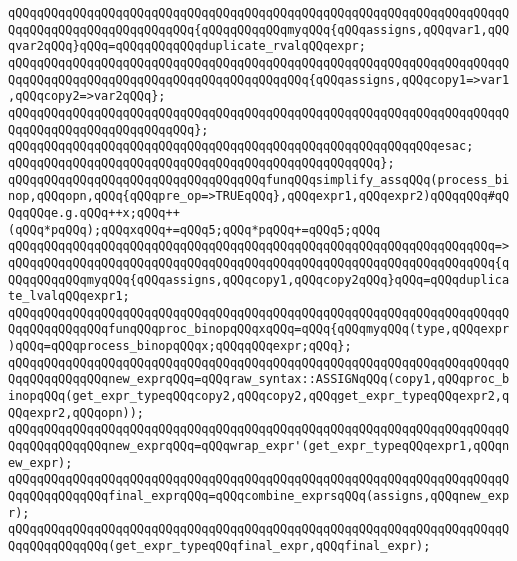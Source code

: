 \verb|qQQqqQQqqQQqqQQqqQQqqQQqqQQqqQQqqQQqqQQqqQQqqQQqqQQqqQQqqQQqqQQqqQQqqQQqqQQqqQQqqQQqqQQqqQQqqQQq{qQQqqQQqqQQqmyqQQq{qQQqassigns,qQQqvar1,qQQqvar2qQQq}qQQq=qQQqqQQqqQQqduplicate_rvalqQQqexpr;|\newline
\newline
\verb|qQQqqQQqqQQqqQQqqQQqqQQqqQQqqQQqqQQqqQQqqQQqqQQqqQQqqQQqqQQqqQQqqQQqqQQqqQQqqQQqqQQqqQQqqQQqqQQqqQQqqQQqqQQqqQQq{qQQqassigns,qQQqcopy1=>var1,qQQqcopy2=>var2qQQq};|\newline
\verb|qQQqqQQqqQQqqQQqqQQqqQQqqQQqqQQqqQQqqQQqqQQqqQQqqQQqqQQqqQQqqQQqqQQqqQQqqQQqqQQqqQQqqQQqqQQqqQQq};|\newline
\verb|qQQqqQQqqQQqqQQqqQQqqQQqqQQqqQQqqQQqqQQqqQQqqQQqqQQqqQQqqQQqesac;|\newline
\verb|qQQqqQQqqQQqqQQqqQQqqQQqqQQqqQQqqQQqqQQqqQQqqQQqqQQq};|\newline
\newline
\verb|qQQqqQQqqQQqqQQqqQQqqQQqqQQqqQQqqQQqfunqQQqsimplify_assqQQq(process_binop,qQQqopn,qQQq{qQQqpre_op=>TRUEqQQq},qQQqexpr1,qQQqexpr2)qQQqqQQq#qQQqqQQqe.g.qQQq++x;qQQq++(qQQq*pqQQq);qQQqxqQQq+=qQQq5;qQQq*pqQQq+=qQQq5;qQQq|\newline
\verb|qQQqqQQqqQQqqQQqqQQqqQQqqQQqqQQqqQQqqQQqqQQqqQQqqQQqqQQqqQQqqQQqqQQq=>|\newline
\verb|qQQqqQQqqQQqqQQqqQQqqQQqqQQqqQQqqQQqqQQqqQQqqQQqqQQqqQQqqQQqqQQqqQQq{qQQqqQQqqQQqmyqQQq{qQQqassigns,qQQqcopy1,qQQqcopy2qQQq}qQQq=qQQqduplicate_lvalqQQqexpr1;|\newline
\verb|qQQqqQQqqQQqqQQqqQQqqQQqqQQqqQQqqQQqqQQqqQQqqQQqqQQqqQQqqQQqqQQqqQQqqQQqqQQqqQQqqQQqfunqQQqproc_binopqQQqxqQQq=qQQq{qQQqmyqQQq(type,qQQqexpr)qQQq=qQQqprocess_binopqQQqx;qQQqqQQqexpr;qQQq};|\newline
\verb|qQQqqQQqqQQqqQQqqQQqqQQqqQQqqQQqqQQqqQQqqQQqqQQqqQQqqQQqqQQqqQQqqQQqqQQqqQQqqQQqqQQqnew_exprqQQq=qQQqraw_syntax::ASSIGNqQQq(copy1,qQQqproc_binopqQQq(get_expr_typeqQQqcopy2,qQQqcopy2,qQQqget_expr_typeqQQqexpr2,qQQqexpr2,qQQqopn));|\newline
\verb|qQQqqQQqqQQqqQQqqQQqqQQqqQQqqQQqqQQqqQQqqQQqqQQqqQQqqQQqqQQqqQQqqQQqqQQqqQQqqQQqqQQqnew_exprqQQq=qQQqwrap_expr'(get_expr_typeqQQqexpr1,qQQqnew_expr);|\newline
\verb|qQQqqQQqqQQqqQQqqQQqqQQqqQQqqQQqqQQqqQQqqQQqqQQqqQQqqQQqqQQqqQQqqQQqqQQqqQQqqQQqqQQqfinal_exprqQQq=qQQqcombine_exprsqQQq(assigns,qQQqnew_expr);|\newline
\newline
\verb|qQQqqQQqqQQqqQQqqQQqqQQqqQQqqQQqqQQqqQQqqQQqqQQqqQQqqQQqqQQqqQQqqQQqqQQqqQQqqQQqqQQq(get_expr_typeqQQqfinal_expr,qQQqfinal_expr);|\newline
